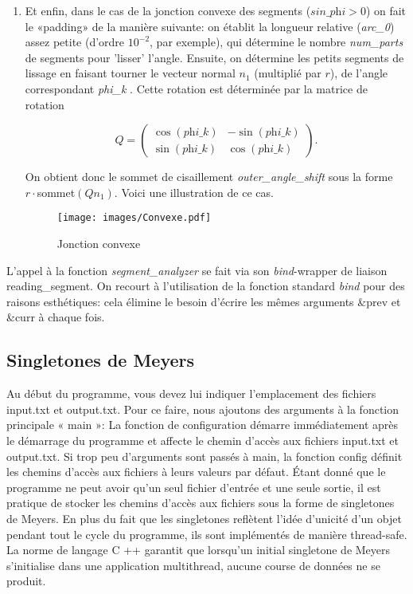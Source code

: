 \documentclass[12pt]{article}
\begin{document}
\begin{enumerate}
		\item Et enfin, dans le cas de la jonction convexe des segments ($\textit{sin\_phi} > 0$) on fait le «padding» de la manière suivante: on établit la longueur relative (\textit{arc\_0}) assez petite (d'ordre $10^{-2}$, par exemple), qui détermine le nombre \textit{num\_parts} de segments pour 'lisser' l'angle. Ensuite, on détermine les petits segments de lissage en faisant tourner le vecteur normal $n_1$ (multiplié par $r$), de l'angle correspondant \textit{phi\_k} . Cette rotation est déterminée par la matrice de rotation 
		
		\begin{equation*}
		Q = 
		\begin{pmatrix}
		\cos(\textit{phi\_k}) & -\sin(\textit{phi\_k}) \\
		\sin(\textit{phi\_k}) &  \cos(\textit{phi\_k})
		\end{pmatrix}.
		\end{equation*}
		
		On obtient donc le sommet de cisaillement \textit{outer\_angle\_shift} sous la forme $r\cdot$sommet$(Qn_1)$. Voici une illustration de ce cas.
		
		\begin{figure}[H]
			\centering
			\texttt{[image: images/Convexe.pdf]}
			\caption{Jonction convexe}
			\label{fig:convex}
		\end{figure}
		
	\end{enumerate}
	
	L'appel à la fonction \textit{segment\_analyzer} se fait via son \textit{bind}-wrapper de liaison reading\_segment. On recourt à l'utilisation de la fonction standard \textit{bind} pour des raisons esthétiques: cela élimine le besoin d'écrire les mêmes arguments \&prev et \&curr à chaque fois.
	
	\subsection {Singletones de Meyers}
	Au début du programme, vous devez lui indiquer l'emplacement des fichiers input.txt et output.txt. Pour ce faire, nous ajoutons des arguments à la fonction principale « main »:
	La fonction de configuration démarre immédiatement après le démarrage du programme et affecte le chemin d'accès aux fichiers input.txt et output.txt. Si trop peu d'arguments sont passés à main, la fonction config définit les chemins d'accès aux fichiers à leurs valeurs par défaut. Étant donné que le programme ne peut avoir qu'un seul fichier d'entrée et une seule sortie, il est pratique de stocker les chemins d'accès aux fichiers sous la forme de singletones de Meyers. En plus du fait que les singletones reflètent l'idée d'unicité d'un objet pendant tout le cycle du programme, ils sont implémentés de manière thread-safe. La norme de langage C ++ garantit que lorsqu'un initial singletone de Meyers s'initialise dans une application multithread, aucune course de données ne se produit.
	
\end{document}
